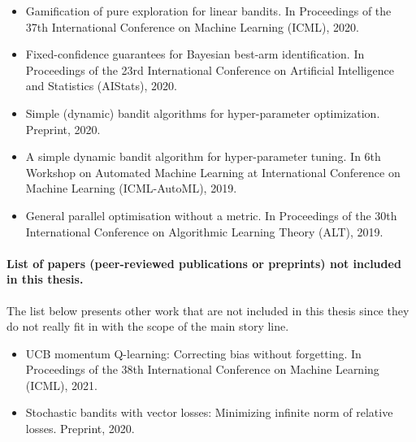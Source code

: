 \begin{itemize}[label=]
    \item Gamification of pure exploration for linear bandits. In Proceedings of the 37th International Conference on Machine Learning (ICML), 2020.~\citep{degenne2020game}
    \item Fixed-confidence guarantees for Bayesian best-arm identification. In Proceedings of the 23rd International Conference on Artificial Intelligence and Statistics (AIStats), 2020.\citep{shang2020t3c}
    \item Simple (dynamic) bandit algorithms for hyper-parameter optimization. Preprint, 2020.~\citep{shang2020dttts}
    \item A simple dynamic bandit algorithm for hyper-parameter tuning. In 6th Workshop on Automated Machine Learning at International Conference on Machine Learning (ICML-AutoML), 2019.~\citep{shang2019dttts}
    \item General parallel optimisation without a metric. In Proceedings of the 30th International Conference on Algorithmic Learning Theory (ALT), 2019.~\citep{shang2019adaptive}
\end{itemize}

\paragraph{List of papers (peer-reviewed publications or preprints) not included in this thesis.}

The list below presents other work that are not included in this thesis since they do not really fit in with the scope of the main story line.

\begin{itemize}[label=]
    \item UCB momentum Q-learning: Correcting bias without forgetting. In Proceedings of the 38th International Conference on Machine Learning (ICML), 2021.~\citep{menard2021ucbmq}
    \item Stochastic bandits with vector losses: Minimizing infinite norm of relative losses. Preprint, 2020.~\citep{shang2020vector}
\end{itemize}

